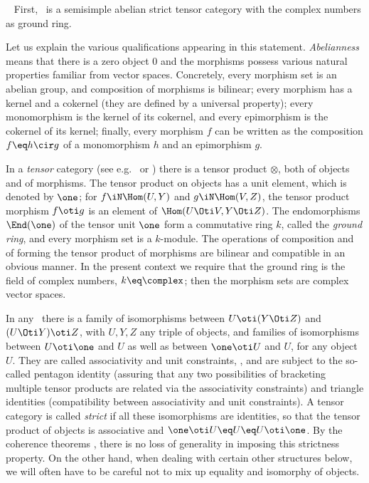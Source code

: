\smallskip\noindent\nxt~%
First, \calc\ is a semisimple abelian strict tensor category 
with the complex numbers as ground ring.

Let us explain the various qualifications appearing in this statement.
%
{\em Abelianness\/} \cite[chapter\,VIII]{MAcl} means that there is a zero 
object 0 and the morphisms possess various natural properties 
familiar from vector spaces. Concretely, every morphism set is an abelian
group, and composition of morphisms is bilinear;
every morphism has a kernel and a cokernel (they are defined by a universal
property); every monomorphism is the kernel of its cokernel, and every
epimorphism is the cokernel of its kernel; finally, every morphism $f$ can 
be written as the composition $f\eq h\cir g$ of a monomorphism $h$ and an 
epimorphism $g$. 

\noindent
In a {\em tensor\/} category (see e.g.\ \cite[chapter\,VII]{MAcl} or
\cite[chapter\,XI]{KAss}) there is a tensor product $\otimes$,
both of objects and of morphisms. The tensor product on objects has a unit 
element, which is denoted by $\one$; for $f\iN\Hom(U,Y)$ and $g\iN\Hom(V,Z)$,
the tensor product morphism $f\oti g$ is an element of $\Hom(U\Oti V,Y\Oti Z)$.
The endomorphisms $\End(\one)$ of the tensor unit $\one$ form a commutative ring 
$k$, called the {\em ground ring\/}, and every morphism set is a $k$-module. 
The operations of composition and of forming the tensor product of morphisms 
are bilinear and compatible in an obvious manner. In the present context we 
require that the ground ring is the field of complex numbers, $k\eq\complex$; 
then the morphism sets are complex vector spaces.

\noindent
In any \tc\ there is a family of isomorphisms between $U\oti(Y\Oti Z)$ 
and $(U\Oti Y)\oti Z$, with $U,Y,Z$ any triple of objects, and families of
isomorphisms between $U\oti\one$ and $U$ as well as between $\one\oti U$ and 
$U$, for any object $U$. They are called associativity and unit constraints, 
\resp, and are subject to the so-called pentagon identity (assuring
that any two possibilities of bracketing multiple tensor products are related
via the associativity constraints) and triangle identities (compatibility
between associativity and unit constraints). A tensor category is called 
{\em strict\/} if all these isomorphisms are identities, so that the tensor 
product of objects is associative and $\one\oti U\eq U\eq U\oti\one$. By the
coherence theorems \cite[chapter\,VII.2]{MAcl}, there is no loss of generality
in imposing this strictness property. On the other hand, when dealing 
with certain other structures below, we will often have to be careful 
not to mix up equality and isomorphy of objects.

